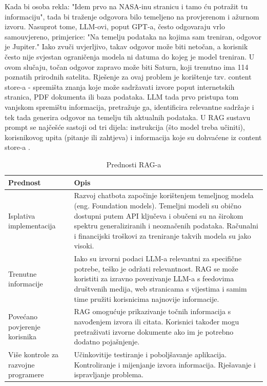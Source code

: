 \documentclass[]{foi}
\begin{document}
Kada bi osoba rekla: "Idem prvo na NASA-inu stranicu i tamo ću potražit tu informaciju", tada bi traženje odgovora bilo temeljeno na provjerenom i ažurnom izvoru.
Nasuprot tome, LLM-ovi, poput GPT-a, često odgovaraju vrlo samouvjereno, primjerice: "Na temelju podataka na kojima sam treniran, odgovor je Jupiter."
Iako zvuči uvjerljivo, takav odgovor može biti netočan, a korisnik često nije svjestan ograničenja modela ni datuma do kojeg je model treniran. U ovom slučaju, točan odgovor 
zapravo može biti Saturn, koji trenutno ima 114 poznatih prirodnih satelita. Rješenje za ovaj problem je korištenje tzv. content store-a - spremišta znanja koje može sadržavati izvore poput
internetskih stranica, PDF dokumenta ili baza podataka. LLM tada prvo pristupa tom vanjskom spremištu informacija, pretražuje ga, identificira relevantne sadržaje i tek tada generira
odgovor na temelju tih aktualnih podataka. U RAG sustavu prompt se najčešće sastoji od tri dijela: instrukcija (što model treba učiniti), korisnikovog upita (pitanje ili zahtjeva) i informacija 
koje su dohvaćene iz content store-a \cite{ibm2023rag}.

\begin{table}[ht!]
    \centering
    \caption{Prednosti RAG-a \cite{awsRAG2025}}
    \begin{tabular}{|>{\centering\arraybackslash}m{5cm}|>{\raggedright\arraybackslash}m{10cm}|}
      \hline
      \textbf{Prednost} & \textbf{Opis} \\
      \hline
      Isplativa implementacija & Razvoj chatbota započinje korištenjem temeljnog modela (eng. Foundation models). Temeljni modeli su obično dostupni putem API ključeva i obučeni su na širokom spektru generaliziranih i neoznačenih podataka. Računalni i financijski troškovi za treniranje takvih modela su jako visoki. \\
      \hline
      Trenutne informacije & Iako su izvorni podaci LLM-a relevantni za specifične potrebe, teško je održati relevantnost. RAG se može koristiti za izravno povezivanje LLM-a s feedovima društvenih medija, web stranicama s vijestima i samim time pružiti korisnicima najnovije informacije. \\
      \hline
      Povećano povjerenje korisnika & RAG omogućuje prikazivanje točnih informacija s navođenjem izvora ili citata. Korisnici također mogu pretraživati izvorne dokumente ako im je potrebno dodatno pojašnjenje. \\
      \hline
      Više kontrole za razvojne programere & Učinkovitije testiranje i poboljšavanje aplikacija. Kontroliranje i mijenjanje izvora informacija. Rješavanje i ispravljanje problema. \\
      \hline
    \end{tabular}
\end{table}
\end{document}
